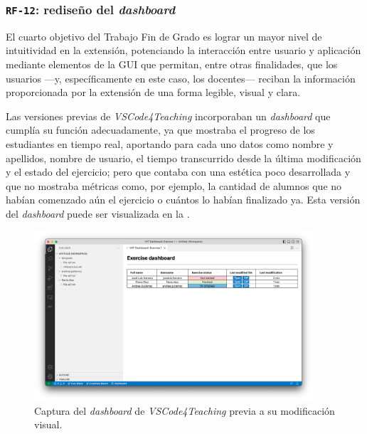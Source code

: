 \subsubsection{\texttt{RF-12}: rediseño del \textit{dashboard}}
\label{subsec:rf12}

El cuarto objetivo del Trabajo Fin de Grado es lograr un mayor nivel de intuitividad en la extensión, potenciando la interacción entre usuario y aplicación mediante elementos de la GUI que permitan, entre otras finalidades, que los usuarios ---y, específicamente en este caso, los docentes--- reciban la información proporcionada por la extensión de una forma legible, visual y clara.

Las versiones previas de \textit{VSCode4Teaching} incorporaban un \textit{dashboard} que cumplía su función adecuadamente, ya que mostraba el progreso de los estudiantes en tiempo real, aportando para cada uno datos como nombre y apellidos, nombre de usuario, el tiempo transcurrido desde la última modificación y el estado del ejercicio; pero que contaba con una estética poco desarrollada y que no mostraba métricas como, por ejemplo, la cantidad de alumnos que no habían comenzado aún el ejercicio o cuántos lo habían finalizado ya. Esta versión del \textit{dashboard} puede ser visualizada en la .

\begin{figure}[ht]
    \centering
    \includegraphics[width=0.925\textwidth]{imagenes/utilizadas/4-3-implementacion/rf12-1.png}
    \caption{Captura del \textit{dashboard} de \textit{VSCode4Teaching} previa a su modificación visual.}
    \label{fig:reqf12-1}
\end{figure}

